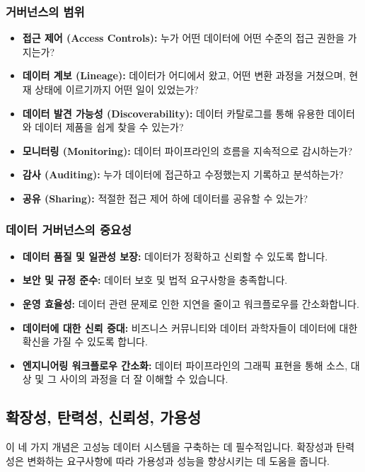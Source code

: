 \documentclass[11pt,a4paper]{article}
\begin{document}
\begin{enumerate}
\subsubsection{거버넌스의 범위}
\begin{itemize}
    \item \textbf{접근 제어 (Access Controls):} 누가 어떤 데이터에 어떤 수준의 접근 권한을 가지는가?
    \item \textbf{데이터 계보 (Lineage):} 데이터가 어디에서 왔고, 어떤 변환 과정을 거쳤으며, 현재 상태에 이르기까지 어떤 일이 있었는가?
    \item \textbf{데이터 발견 가능성 (Discoverability):} 데이터 카탈로그를 통해 유용한 데이터와 데이터 제품을 쉽게 찾을 수 있는가?
    \item \textbf{모니터링 (Monitoring):} 데이터 파이프라인의 흐름을 지속적으로 감시하는가?
    \item \textbf{감사 (Auditing):} 누가 데이터에 접근하고 수정했는지 기록하고 분석하는가?
    \item \textbf{공유 (Sharing):} 적절한 접근 제어 하에 데이터를 공유할 수 있는가?
\end{itemize}

\subsubsection{데이터 거버넌스의 중요성}
\begin{itemize}
    \item \textbf{데이터 품질 및 일관성 보장:} 데이터가 정확하고 신뢰할 수 있도록 합니다.
    \item \textbf{보안 및 규정 준수:} 데이터 보호 및 법적 요구사항을 충족합니다.
    \item \textbf{운영 효율성:} 데이터 관련 문제로 인한 지연을 줄이고 워크플로우를 간소화합니다.
    \item \textbf{데이터에 대한 신뢰 증대:} 비즈니스 커뮤니티와 데이터 과학자들이 데이터에 대한 확신을 가질 수 있도록 합니다.
    \item \textbf{엔지니어링 워크플로우 간소화:} 데이터 파이프라인의 그래픽 표현을 통해 소스, 대상 및 그 사이의 과정을 더 잘 이해할 수 있습니다.
\end{itemize}

\newpage
\subsection{확장성, 탄력성, 신뢰성, 가용성}

이 네 가지 개념은 고성능 데이터 시스템을 구축하는 데 필수적입니다. 확장성과 탄력성은 변화하는 요구사항에 따라 가용성과 성능을 향상시키는 데 도움을 줍니다.


\end{enumerate}
\end{document}
